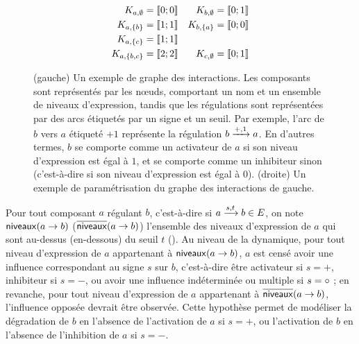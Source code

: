 \begin{example}
\begin{figure}[ht]
\begin{minipage}{0.49\textwidth}
{
    }
    \end{minipage}
    \begin{minipage}{0.49\textwidth}
    \centering
    \begin{align*}
      K_{a,\emptyset} &= \mathopen{\llbracket}0\mathclose{};0\mathclose{\rrbracket} & K_{b,\emptyset} &= \mathopen{\llbracket}0\mathclose{};1\mathclose{\rrbracket} \\
      K_{a,\{b\}} &= \mathopen{\llbracket}1\mathclose{};1\mathclose{\rrbracket} & K_{b,\{a\}} &= \mathopen{\llbracket}0\mathclose{};0\mathclose{\rrbracket} \\
      K_{a,\{c\}} &= \mathopen{\llbracket}1\mathclose{};1\mathclose{\rrbracket} &&\\
      K_{a,\{b,c\}} &= \mathopen{\llbracket}2\mathclose{};2\mathclose{\rrbracket} & K_{c,\emptyset} &= \mathopen{\llbracket}0\mathclose{};1\mathclose{\rrbracket}
    \end{align*}
    \end{minipage}
    \caption{%
      (gauche)
        Un exemple de graphe des interactions.
        Les composants sont représentés par les nœuds, comportant un nom et un
        ensemble de niveaux d'expression,
        tandis que les régulations sont représentées par des arcs
        étiquetés par un signe et un seuil.
        Par exemple, l'arc de $b$ vers $a$ étiqueté $+1$ représente la régulation $b \xrightarrow{+, 1} a$.
        En d'autres termes, $b$ se comporte comme un activateur de $a$ si son niveau d'expression
        est égal à $1$, et se comporte comme un inhibiteur sinon (c'est-à-dire si son niveau
        d'expression est égal à $0$).
      (droite)
        Un exemple de paramétrisation du graphe des interactions de gauche.
    }
  \end{figure}
\end{example}

Pour tout composant $a$ régulant $b$, c'est-à-dire si $a \xrightarrow{s, t} b \in E$,
on note $\mathsf{niveaux}(a\rightarrow b)$ (\resp $\overline{\mathsf{niveaux}}(a\rightarrow b)$) l'ensemble des niveaux d'expression
de $a$ qui sont au-dessus (\resp en-dessous) du seuil $t$ ().
Au niveau de la dynamique,
pour tout niveau d'expression de $a$ appartenant à $\mathsf{niveaux}(a\rightarrow b)$, $a$ est censé avoir
une influence correspondant au signe $s$ sur $b$,
c'est-à-dire être activateur si $s = +$, inhibiteur si $s = -$,
ou avoir une influence indéterminée ou multiple si $s = \circ$ ;
en revanche, pour tout niveau d'expression de $a$ appartenant à $\overline{\mathsf{niveaux}}(a\rightarrow b)$,
l'influence opposée devrait être observée.
Cette hypothèse permet de modéliser la dégradation de $b$ en l'absence de l'activation de $a$
si $s = +$, ou l'activation de $b$ en l'absence de l'inhibition de $a$ si $s = -$.

